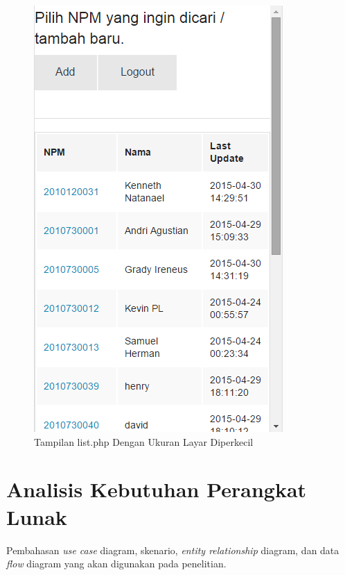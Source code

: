 \begin{figure}[ht]
\centering
\includegraphics[scale=0.5]{Gambar/contohzurb1.png}
\caption[Tampilan list.php Dengan Ukuran Layar Diperkecil]{Tampilan list.php Dengan Ukuran Layar Diperkecil}
\label{fig:contohzurb1}
\end{figure}

\section{Analisis Kebutuhan Perangkat Lunak}
\label{sec:analisiskebutuhanperangkatlunak}

Pembahasan {\it use case} diagram, skenario, {\it entity relationship} diagram, dan data {\it flow} diagram yang akan digunakan pada penelitian.

